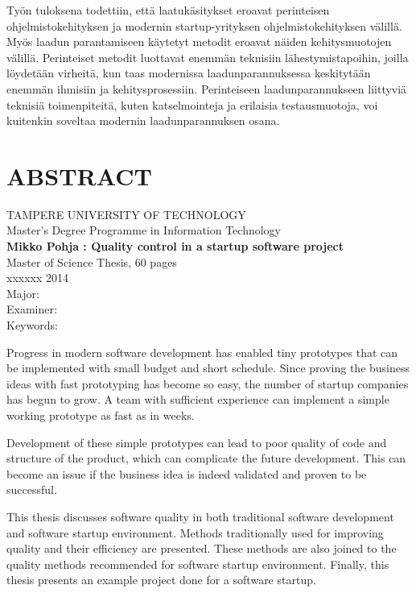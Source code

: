 \noindent
Työn tuloksena todettiin, että laatukäsitykset eroavat perinteisen ohjelmistokehityksen ja modernin startup-yrityksen ohjelmistokehityksen välillä. Myös laadun parantamiseen käytetyt metodit eroavat näiden kehitysmuotojen välillä. Perinteiset metodit luottavat enemmän teknisiin lähestymistapoihin, joilla löydetään virheitä, kun taas modernissa laadunparannuksessa keskitytään enemmän ihmisiin ja kehitysprosessiin. Perinteiseen laadunparannukseen liittyviä teknisiä toimenpiteitä, kuten katselmointeja ja erilaisia testausmuotoja, voi kuitenkin soveltaa modernin laadunparannuksen osana. 

\newpage
\chapter*{ABSTRACT}
\begin{spacing}{1.0}
\textsf{TAMPERE UNIVERSITY OF TECHNOLOGY}\\
\textsf{Master's Degree Programme in Information Technology}\\
{\bf \textsf{Mikko Pohja : Quality control in a startup software project}}\\
\textsf{Master of Science Thesis, 60 pages}\\
\textsf{xxxxxx 2014}\\
\textsf{Major: }\\
\textsf{Examiner: }\\
\textsf{Keywords: }\\
\end{spacing}
 
\noindent
Progress in modern software development has enabled tiny prototypes that can be implemented with small budget and short schedule. Since proving the business ideas with fast prototyping has become so easy, the number of startup companies has begun to grow. A team with sufficient experience can implement a simple working prototype as fast as in weeks.
 
\noindent
Development of these simple prototypes can lead to poor quality of code and structure of the product, which can complicate the future development. This can become an issue if the business idea is indeed validated and proven to be successful.

\noindent
This thesis discusses software quality in both traditional software development and software startup environment. Methods traditionally used for improving quality and their efficiency are presented. These methods are also joined to the quality methods recommended for software startup environment. Finally, this thesis presents an example project done for a software startup.

